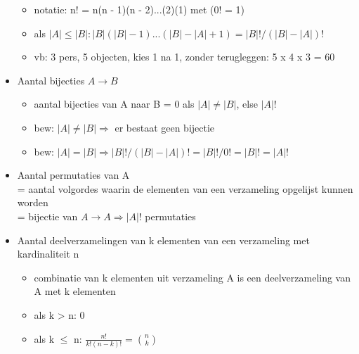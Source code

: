 \documentclass{article}
\begin{document}
\begin{itemize}
\begin{itemize}
        \item notatie: n! = n(n - 1)(n - 2)...(2)(1) met (0! = 1)
        \item als $|A| \leq |B|: |B|(|B| - 1)...(|B| - |A| + 1) = |B|! / (|B| - |A|)!$
        \item vb: 3 pers, 5 objecten, kies 1 na 1, zonder terugleggen: 5 x 4 x 3 = 60
    \end{itemize}
    \item Aantal bijecties $A \rightarrow B$
    \begin{itemize}
        \item aantal bijecties van A naar B = 0 als $|A| \not = |B|$, else $|A|!$
        \item bew: $|A| \not = |B| \Rightarrow$ er bestaat geen bijectie
        \item bew: $|A| = |B| \Rightarrow |B|!/(|B| - |A|)! = |B|!/0! = |B|! = |A|!$
    \end{itemize}
    \item Aantal permutaties van A \\ 
    = aantal volgordes waarin de elementen van een verzameling opgelijst kunnen worden \\ 
    = bijectie van $A \rightarrow A \Rightarrow |A|!$ permutaties
    \item Aantal deelverzamelingen van k elementen van een verzameling met kardinaliteit n
    \begin{itemize}
        \item combinatie van k elementen uit verzameling A is een deelverzameling van A met k elementen
        \item als k > n: 0
        \item als k $\leq$ n: $\frac{n!}{k!(n-k)!} = \binom{n}{k}$
    \end{itemize}
\end{itemize}
\end{document}
